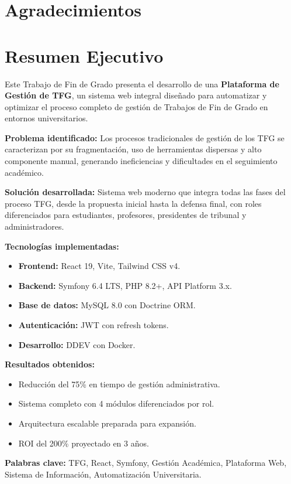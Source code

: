 \newpage
\chapter*{Agradecimientos}
\newpage

\newpage
\chapter*{Resumen Ejecutivo}

Este Trabajo de Fin de Grado presenta el desarrollo de una \textbf{Plataforma de Gestión de TFG}, un sistema web integral diseñado para automatizar y 
optimizar el proceso completo de gestión de Trabajos de Fin de Grado en 
entornos universitarios.

\textbf{Problema identificado:} Los procesos tradicionales de gestión de los TFG 
se caracterizan por su fragmentación, uso de herramientas dispersas y 
alto componente manual, generando ineficiencias y dificultades en el 
seguimiento académico.

\textbf{Solución desarrollada:} Sistema web moderno que integra todas las 
fases del proceso TFG, desde la propuesta inicial hasta la defensa final, 
con roles diferenciados para estudiantes, profesores, presidentes de 
tribunal y administradores.

\textbf{Tecnologías implementadas:}
\begin{itemize}
    \item \textbf{Frontend:} React 19, Vite, Tailwind CSS v4.
    \item \textbf{Backend:} Symfony 6.4 LTS, PHP 8.2+, API Platform 3.x.
    \item \textbf{Base de datos:} MySQL 8.0 con Doctrine ORM.
    \item \textbf{Autenticación:} JWT con refresh tokens.
    \item \textbf{Desarrollo:} DDEV con Docker.
\end{itemize}

\textbf{Resultados obtenidos:}
\begin{itemize}
    \item Reducción del 75\% en tiempo de gestión administrativa.
    \item Sistema completo con 4 módulos diferenciados por rol.
    \item Arquitectura escalable preparada para expansión.
    \item ROI del 200\% proyectado en 3 años.
\end{itemize}

\textbf{Palabras clave:} TFG, React, Symfony, Gestión Académica, Plataforma Web, 
Sistema de Información, Automatización Universitaria.
